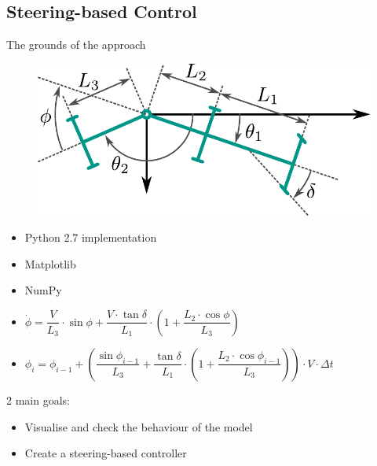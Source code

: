 
\subsection{Steering-based Control}
\begin{frame}{The grounds of the approach}
\begin{minipage}{0.5\textwidth}
    \begin{figure}[H]
        \centering
        \includegraphics[width=\textwidth]{images/trailer-diagram-marti}
        \label{fig:geom-model-marti}
    \end{figure}
\end{minipage}%
\hfill%
\begin{minipage}{0.5\textwidth}
\begin{itemize}
    \item Python 2.7 implementation
    \item Matplotlib
    \item NumPy
\end{itemize}
\end{minipage}

\begin{itemize}
    \item \footnotesize{$\dot{\phi} = \dfrac{V}{L_3} \cdot \sin{\phi} + \dfrac{V \cdot \tan{\delta}}{L_1} \cdot \left(1 + \dfrac{L_2 \cdot \cos{\phi}}{L_3}\right)$}
    \item \footnotesize{$\phi_i = \phi_{i-1} + \left( \dfrac{\sin{\phi_{i-1}}}{L_3} + \dfrac{\tan{\delta}}{L_1} \cdot \left( 1 + \dfrac{L_2 \cdot \cos{\phi_{i-1}}}{L_3}\right)\right) \cdot V \cdot \Delta t$}
\end{itemize}

2 main goals:
\begin{itemize}
    \item Visualise and check the behaviour of the model
    \item Create a steering-based controller
\end{itemize}
\end{frame}

